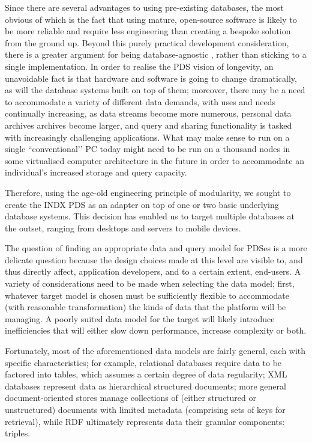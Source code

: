 \documentclass[graybox]{svmult}
\begin{document}
Since there are several advantages to using pre-existing databases, the most obvious of which is the fact that using mature, open-source software is likely to be more reliable and require less engineering than creating a bespoke solution from the ground up. Beyond this purely practical development consideration, there is a greater argument for being database-agnostic \cite{chohan2011database}, rather than sticking to a single implementation.  In order to realise the PDS vision of longevity, an unavoidable fact is that hardware and software is going to change dramatically, as will the database systems built on top of them; moreover, there may be a need to accommodate a variety of different data demands, with uses and needs continually increasing, as data streams become more numerous, personal data archives archives become larger, and query and sharing functionality is tasked with increasingly challenging applications.  What may make sense to run on a single ``conventional’’ PC today might need to be run on a thousand nodes in some virtualised computer architecture in the future in order to accommodate an individual’s increased storage and query capacity.

Therefore, using the age-old engineering principle of modularity, we sought to create the INDX PDS as an adapter on top of one or two basic underlying database systems.  This decision has enabled us to target multiple databases at the outset, ranging from desktops and servers to mobile devices. 

The question of finding an appropriate data and query model for PDSes is a more delicate question because the design choices made at this level are visible to, and thus directly affect, application developers, and to a certain extent, end-users.  A variety of considerations need to be made when selecting the data model; first, whatever target model is chosen must be sufficiently flexible to accommodate (with reasonable transformation) the kinds of data that the platform will be managing.  A poorly suited data model for the target will likely introduce inefficiencies that will either slow down performance, increase complexity or both.

Fortunately, most of the aforementioned data models are fairly general, each with specific characteristics; for example, relational databases require data to be factored into tables, which assumes a certain degree of data regularity; XML databases represent data as hierarchical structured documents; more general document-oriented stores manage collections of (either structured or unstructured) documents with limited metadata (comprising sets of keys for retrieval), while RDF ultimately represents data their granular components: triples.  
\end{document}
